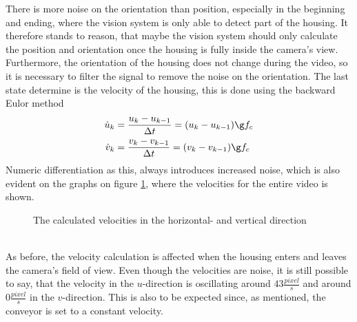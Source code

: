 There is more noise on the orientation than position, especially in the beginning and ending, where the vision system is only able to detect part of the housing. It therefore stands to reason, that maybe the vision system should only calculate the position and orientation once the housing is fully inside the camera's view. Furthermore, the orientation of the housing does not change during the video, so it is necessary to filter the signal to remove the noise on the orientation. The last state determine is the velocity of the housing, this is done using the backward Eulor method
\begin{align}
\dot u_k &= \frac{u_k-u_{k-1}}{\Delta t} = (u_k-u_{k-1})\g f_c\\
\dot v_k &= \frac{v_k-v_{k-1}}{\Delta t} = (v_k-v_{k-1})\g f_c
\end{align}
Numeric differentiation as this, always introduces increased noise, which is also evident on the graphs on figure \ref{fig_vid_vec}, where the velocities for the entire video is shown.
\begin{figure}[htbp!]
	\centering
\caption{The calculated velocities in the horizontal- and vertical direction}
\label{fig_vid_vec}
\end{figure}\\
As before, the velocity calculation is affected when the housing enters and leaves the camera's field of view. Even though the velocities are noise, it is still possible to say, that the velocity in the $u$-direction is oscillating around $43 \frac{pixel}{s}$ and around $0 \frac{pixel}{s}$ in the $v$-direction. This is also to be expected since, as mentioned, the conveyor is set to a constant velocity. 